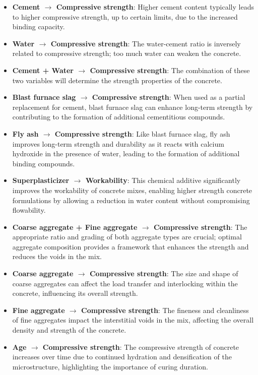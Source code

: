 \documentclass{article}
\begin{document}
\begin{minipage}[t]{0.7\linewidth}
    \begin{itemize}
\item \textbf{Cement $\rightarrow$ Compressive strength}: Higher cement content typically leads to higher compressive strength, up to certain limits, due to the increased binding capacity.
\item \textbf{Water $\rightarrow$ Compressive strength}: The water-cement ratio is inversely related to compressive strength; too much water can weaken the concrete.
\item \textbf{Cement + Water $\rightarrow$ Compressive strength}: The combination of these two variables will determine the strength properties of the concrete.
\item \textbf{Blast furnace slag $\rightarrow$ Compressive strength}: When used as a partial replacement for cement, blast furnace slag can enhance long-term strength by contributing to the formation of additional cementitious compounds.
\item \textbf{Fly ash $\rightarrow$ Compressive strength}: Like blast furnace slag, fly ash improves long-term strength and durability as it reacts with calcium hydroxide in the presence of water, leading to the formation of additional binding compounds.
\item \textbf{Superplasticizer $\rightarrow$ Workability}: This chemical additive significantly improves the workability of concrete mixes, enabling higher strength concrete formulations by allowing a reduction in water content without compromising flowability.
\item \textbf{Coarse aggregate + Fine aggregate $\rightarrow$ Compressive strength}: The appropriate ratio and grading of both aggregate types are crucial; optimal aggregate composition provides a framework that enhances the strength and reduces the voids in the mix.
\item \textbf{Coarse aggregate $\rightarrow$ Compressive strength}: The size and shape of coarse aggregates can affect the load transfer and interlocking within the concrete, influencing its overall strength.
\item \textbf{Fine aggregate $\rightarrow$ Compressive strength}: The fineness and cleanliness of fine aggregates impact the interstitial voids in the mix, affecting the overall density and strength of the concrete.
\item \textbf{Age $\rightarrow$ Compressive strength}: The compressive strength of concrete increases over time due to continued hydration and densification of the microstructure, highlighting the importance of curing duration.

\end{itemize}
\end{minipage}
\end{document}
